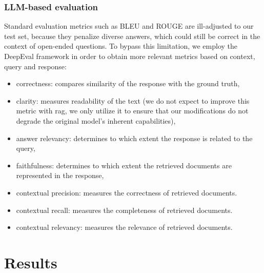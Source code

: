 \documentclass[fleqn,moreauthors,10pt]{ds_report}
\begin{document}
\subsubsection*{LLM-based evaluation}

Standard evaluation metrics such as BLEU and ROUGE are ill-adjusted to our test set, because they penalize diverse answers, which could still be correct in the context of open-ended questions. To bypass this limitation, we employ the DeepEval framework \cite{deepeval} in order to obtain more relevant metrics based on context, query and response:

\begin{itemize}
	\item correctness: compares similarity of the response with the ground truth,
	\item clarity: measures readability of the text (we do not expect to improve this metric with \ac{rag}, we only utilize it to ensure that our modifications do not degrade the original model's inherent capabilities),
	\item answer relevancy: determines to which extent the response is related to the query,
	\item faithfulness: determines to which extent the retrieved documents are represented in the response,
	\item contextual precision: measures the correctness of retrieved documents.
	\item contextual recall: measures the completeness of retrieved documents.
	\item contextual relevancy: measures the relevance of retrieved documents.
\end{itemize} 



\section*{Results}

\begin{table}[t]
{}
\caption{Performance comparison as evaluated by a 14B-parameter Qwen model with DeepEval framework.}
\label{tab:llm_metrics}
\end{table}
\end{document}
